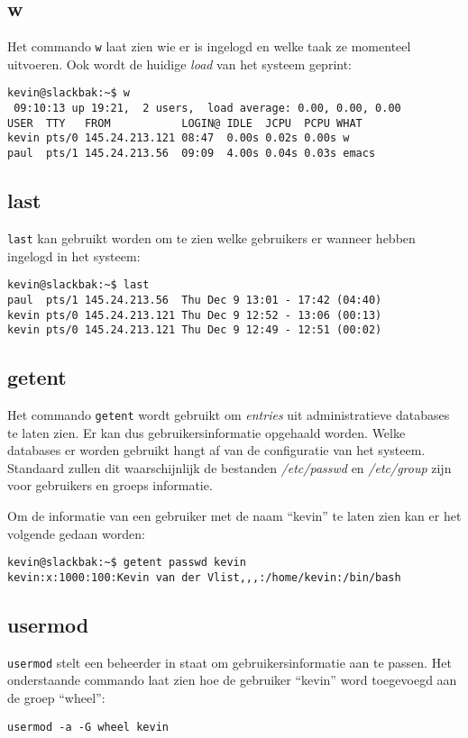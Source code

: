 \subsection{w}
Het commando \texttt{w} laat zien wie er is ingelogd en welke taak ze momenteel uitvoeren. Ook wordt de huidige \emph{load} van het systeem geprint: 
\begin{lstlisting}
kevin@slackbak:~$ w
 09:10:13 up 19:21,  2 users,  load average: 0.00, 0.00, 0.00
USER  TTY   FROM           LOGIN@ IDLE  JCPU  PCPU WHAT
kevin pts/0 145.24.213.121 08:47  0.00s 0.02s 0.00s w
paul  pts/1 145.24.213.56  09:09  4.00s 0.04s 0.03s emacs
\end{lstlisting}%

\subsection{last}
\texttt{last} kan gebruikt worden om te zien welke gebruikers er wanneer hebben ingelogd in het systeem: 
\begin{lstlisting}
kevin@slackbak:~$ last
paul  pts/1 145.24.213.56  Thu Dec 9 13:01 - 17:42 (04:40)    
kevin pts/0 145.24.213.121 Thu Dec 9 12:52 - 13:06 (00:13)    
kevin pts/0 145.24.213.121 Thu Dec 9 12:49 - 12:51 (00:02) 
\end{lstlisting}%

\subsection{getent}
Het commando \texttt{getent} wordt gebruikt om \emph{entries} uit administratieve databases te laten zien. Er kan dus gebruikersinformatie opgehaald worden. Welke databases er worden gebruikt hangt af van de configuratie van het systeem. Standaard zullen dit waarschijnlijk de bestanden \emph{/etc/passwd} en \emph{/etc/group} zijn voor gebruikers en groeps informatie. 

Om de informatie van een gebruiker met de naam ``kevin'' te laten zien kan er het volgende gedaan worden: 
\begin{lstlisting}
kevin@slackbak:~$ getent passwd kevin
kevin:x:1000:100:Kevin van der Vlist,,,:/home/kevin:/bin/bash
\end{lstlisting}%

\subsection{usermod}
\texttt{usermod} stelt een beheerder in staat om gebruikersinformatie aan te passen. Het onderstaande commando laat zien hoe de gebruiker ``kevin'' word toegevoegd aan de groep ``wheel'': 
\begin{lstlisting}
usermod -a -G wheel kevin
\end{lstlisting}

